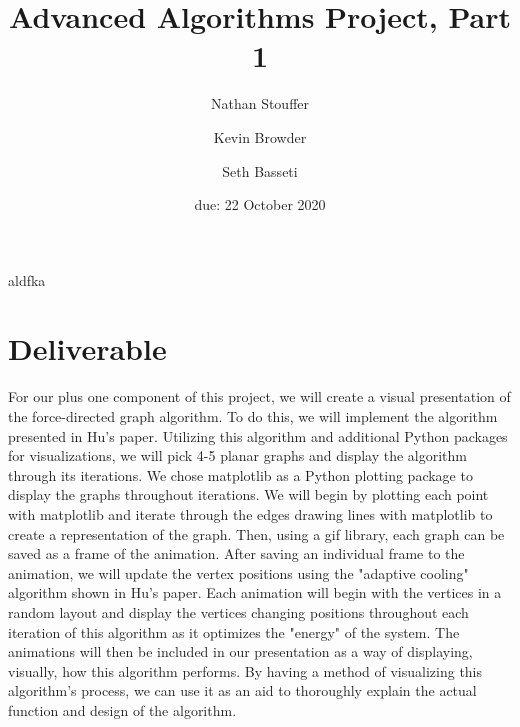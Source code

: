 \documentclass{article}
\title{Advanced Algorithms Project, Part 1}
\author{Nathan Stouffer \and Kevin Browder \and Seth Basseti}
\date{due: 22 October 2020}
\begin{document}
\maketitle

aldfka \cite{hu2005efficient}

\section{Deliverable}
For our plus one component of this project, we will create a visual presentation of the force-directed graph algorithm. 
To do this, we will implement the algorithm presented in Hu's paper. Utilizing this algorithm and additional Python packages for visualizations,
we will pick 4-5 planar graphs and display the algorithm through its iterations. We chose matplotlib as a Python plotting package
to display the graphs throughout iterations. We will begin by plotting each point with matplotlib and iterate through
the edges drawing lines with matplotlib to create a representation of the graph. Then, using a gif library, each graph can be saved as a frame
of the animation. After saving an individual frame to the animation, we will update the vertex positions using the "adaptive cooling" algorithm shown in Hu's paper. 
Each animation will begin with the vertices in a random layout and display the vertices changing positions throughout each iteration of this algorithm
as it optimizes the "energy" of the system. The animations will then be included in our presentation as a way of displaying,
visually, how this algorithm performs. By having a method of visualizing this algorithm's process, we can use it as an aid to
thoroughly explain the actual function and design of the algorithm.

\newpage


\end{document}
